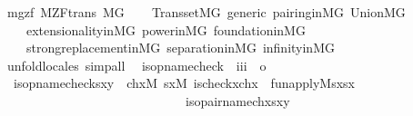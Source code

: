\begin{isabellebody}
{\isafolddocument}%
%
\isadelimdocument
%
\endisadelimdocument
{}\isamarkupfalse%
\ mgzf{\isacharcolon}{\kern0pt}\ M{\isacharunderscore}{\kern0pt}ZF{\isacharunderscore}{\kern0pt}trans\ {\isachardoublequoteopen}M{\isacharbrackleft}{\kern0pt}G{\isacharbrackright}{\kern0pt}{\isachardoublequoteclose}\isanewline
%
\isadelimproof
\ \ %
\endisadelimproof
%
\isatagproof
{}\isamarkupfalse%
\ Transset{\isacharunderscore}{\kern0pt}MG\ generic\ pairing{\isacharunderscore}{\kern0pt}in{\isacharunderscore}{\kern0pt}MG\ Union{\isacharunderscore}{\kern0pt}MG\ \isanewline
\ \ \ \ extensionality{\isacharunderscore}{\kern0pt}in{\isacharunderscore}{\kern0pt}MG\ power{\isacharunderscore}{\kern0pt}in{\isacharunderscore}{\kern0pt}MG\ foundation{\isacharunderscore}{\kern0pt}in{\isacharunderscore}{\kern0pt}MG\ \ \isanewline
\ \ \ \ strong{\isacharunderscore}{\kern0pt}replacement{\isacharunderscore}{\kern0pt}in{\isacharunderscore}{\kern0pt}MG\ separation{\isacharunderscore}{\kern0pt}in{\isacharunderscore}{\kern0pt}MG\ infinity{\isacharunderscore}{\kern0pt}in{\isacharunderscore}{\kern0pt}MG\isanewline
\ \ \isamarkupfalse%
\ unfold{\isacharunderscore}{\kern0pt}locales\ simp{\isacharunderscore}{\kern0pt}all%
\endisatagproof
{\isafoldproof}%
%
\isadelimproof
\isanewline
%
\endisadelimproof
\isanewline
\isanewline
{}\isamarkupfalse%
\isanewline
\ \ is{\isacharunderscore}{\kern0pt}opname{\isacharunderscore}{\kern0pt}check\ {\isacharcolon}{\kern0pt}{\isacharcolon}{\kern0pt}\ {\isachardoublequoteopen}{\isacharbrackleft}{\kern0pt}i{\isacharcomma}{\kern0pt}i{\isacharcomma}{\kern0pt}i{\isacharbrackright}{\kern0pt}\ {\isasymRightarrow}\ o{\isachardoublequoteclose}\ \isanewline
\ \ {\isachardoublequoteopen}is{\isacharunderscore}{\kern0pt}opname{\isacharunderscore}{\kern0pt}check{\isacharparenleft}{\kern0pt}s{\isacharcomma}{\kern0pt}x{\isacharcomma}{\kern0pt}y{\isacharparenright}{\kern0pt}\ {\isasymequiv}\ {\isasymexists}chx{\isasymin}M{\isachardot}{\kern0pt}\ {\isasymexists}sx{\isasymin}M{\isachardot}{\kern0pt}\ is{\isacharunderscore}{\kern0pt}check{\isacharparenleft}{\kern0pt}x{\isacharcomma}{\kern0pt}chx{\isacharparenright}{\kern0pt}\ {\isasymand}\ fun{\isacharunderscore}{\kern0pt}apply{\isacharparenleft}{\kern0pt}{\isacharhash}{\kern0pt}{\isacharhash}{\kern0pt}M{\isacharcomma}{\kern0pt}s{\isacharcomma}{\kern0pt}x{\isacharcomma}{\kern0pt}sx{\isacharparenright}{\kern0pt}\ {\isasymand}\ \isanewline
\ \ \ \ \ \ \ \ \ \ \ \ \ \ \ \ \ \ \ \ \ \ \ \ \ \ \ \ \ is{\isacharunderscore}{\kern0pt}opair{\isacharunderscore}{\kern0pt}name{\isacharparenleft}{\kern0pt}chx{\isacharcomma}{\kern0pt}sx{\isacharcomma}{\kern0pt}y{\isacharparenright}{\kern0pt}{\isachardoublequoteclose}\ \isanewline

\end{isabellebody}
